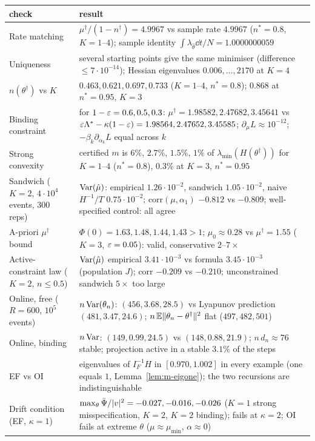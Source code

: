 \begin{center}\small
\begin{tabular}{@{}p{3.1cm}p{9.3cm}@{}}\toprule
check & result\\\midrule
Rate matching & $\mu^\dagger/(1-n^\dagger)=4.9967$ vs sample rate $4.9967$ ($n^*=0.8$, $K=1$--$4$); sample identity $\int\lambda_{\hat\theta}\dd t/N=1.0000000059$\\
Uniqueness & several starting points give the same minimiser (difference $\le7\cdot10^{-14}$); Hessian eigenvalues $0.006,\dots,2170$ at $K=4$\\
$n(\theta^\dagger)$ vs $K$ & $0.463,0.621,0.697,0.733$ ($K=1$--$4$, $n^*=0.8$); $0.868$ at $n^*=0.95$, $K=3$\\
Binding constraint & for $1-\varepsilon=0.6,0.5,0.3$: $\mu^\dagger=1.98582,2.47682,3.45641$ vs $\varepsilon\Lambda^*-\kappa(1-\varepsilon)=1.98564,2.47652,3.45585$; $\partial_\mu L\approx10^{-12}$; $-\beta_k\partial_{\alpha_k}L$ equal across $k$\\
Strong convexity & certified $m$ is $6\%$, $2.7\%$, $1.5\%$, $1\%$ of $\lambda_{\min}(H(\theta^\dagger))$ for $K=1$--$4$ ($n^*=0.8$), $0.3\%$ at $K=3$, $n^*=0.95$\\
Sandwich ($K=2$, $4\cdot10^4$ events, 300 reps) & $\operatorname{Var}(\hat\mu)$: empirical $1.26\cdot10^{-2}$, sandwich $1.05\cdot10^{-2}$, naive $H^{-1}/T$ $0.75\cdot10^{-2}$; corr$(\mu,\alpha_1)$ $-0.812$ vs $-0.809$; well-specified control: all agree\\
A-priori $\mu^\dagger$ bound & $\Phi(0)=1.63,1.48,1.44,1.43>1$; $\mu_0\approx0.28$ vs $\mu^\dagger=1.55$ ($K=3$, $\varepsilon=0.05$): valid, conservative $2$--$7\times$\\
Active-constraint law ($K=2$, $n\le0.5$) & $\operatorname{Var}(\hat\mu)$ empirical $3.41\cdot10^{-3}$ vs formula $3.45\cdot10^{-3}$ (population $J$); corr $-0.209$ vs $-0.210$; unconstrained sandwich $5\times$ too large\\
Online, free ($R=600$, $10^5$ events) & $n\operatorname{Var}(\theta_n)$: $(456,3.68,28.5)$ vs Lyapunov prediction $(481,3.47,24.6)$; $n\,\mathbb{E}\lVert \theta_n-\theta^\dagger\rVert^2$ flat ($497,482,501$)\\
Online, binding & $n\operatorname{Var}$: $(149,0.99,24.5)$ vs $(148,0.88,21.9)$; $n\,d_n\approx76$ stable; projection active in a stable $3.1\%$ of the steps\\
EF vs OI & eigenvalues of $I_F^{-1}H$ in $[0.970,1.002]$ in every example (one equals $1$, Lemma~\ref{lem:m-eigone}); the two recursions are indistinguishable\\
Drift condition (EF, $\kappa=1$) & $\max_\theta\bar\Psi/\lvert v\rvert^2=-0.027,-0.016,-0.026$ ($K=1$ strong misspecification, $K=2$, $K=2$ binding); fails at $\kappa=2$; OI fails at extreme $\theta$ ($\mu\approx\mu_{\min}$, $\alpha\approx0$)\\

\end{tabular}
\end{center}
